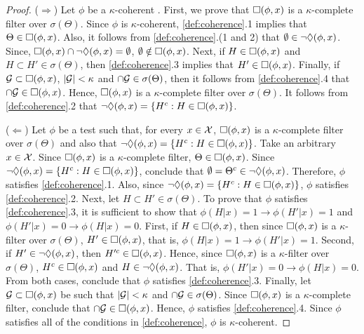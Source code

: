 \begin{proof}
 ($\Longrightarrow$) Let $\phi$ be 
 a $\kappa$-coherent \summ.
 First, we prove that $\square({\phi,x})$ is 
 a $\kappa$-complete filter over $\sigma(\Theta)$.
 Since $\phi$ is $\kappa$-coherent, 
 \cref{def:coherence}.1 implies that
 $\Theta \in \square({\phi,x})$.
 Also, it follows from 
 \cref{def:coherence}.(1 and 2) that
 $\emptyset \in \lnot \Diamond({\phi,x})$.
 Since, $\square({\phi,x}) \cap \lnot \Diamond({\phi,x}) = \emptyset$,
 $\emptyset \notin \square({\phi,x})$.
 Next, if $H \in \square({\phi,x})$ and
 $H \subset H' \in \sigma(\Theta)$, then 
 \cref{def:coherence}.3 implies that
 $H' \in \square({\phi,x})$.
 Finally, if $\mathcal{G} \subset \square({\phi,x})$, 
 $|\mathcal{G}| < \kappa$ and
 $\cap \mathcal{G} \in \sigma(\Theta)$, then
 it follows from \cref{def:coherence}.4 
 that $\cap \mathcal{G} \in \square({\phi,x})$.
 Hence, $\square({\phi,x})$ is 
 a $\kappa$-complete filter over $\sigma(\Theta)$.
 It follows from \cref{def:coherence}.2 that
 $\lnot \Diamond({\phi,x}) = \{H^{c}: H \in \square({\phi,x})\}$.

 ($\Longleftarrow$) Let $\phi$ be a test such that, for every $x \in \mathcal{X}$,
 $\square({\phi,x})$ is a $\kappa$-complete filter over $\sigma(\Theta)$ and 
 also that $\lnot \Diamond({\phi,x}) = \{H^{c}: H \in \square({\phi,x})\}$.
 Take an arbitrary $x \in \mathcal{X}$.
 Since $\square({\phi,x})$ is a $\kappa$-complete filter, 
 $\Theta \in \square({\phi,x})$.
 Since $\lnot \Diamond({\phi,x}) = \{H^{c}: H \in \square({\phi,x})\}$,
 conclude that $\emptyset = \Theta^c \in \lnot \Diamond({\phi,x})$.
 Therefore, $\phi$ satisfies \cref{def:coherence}.1.
 Also, since $\lnot \Diamond({\phi,x}) = \{H^{c}: H \in \square({\phi,x})\}$,
 $\phi$ satisfies \cref{def:coherence}.2.
 Next, let $H \subset H' \in \sigma(\Theta)$.
 To prove that $\phi$ satisfies \cref{def:coherence}.3,
 it is sufficient to show that
 $\phi(H|x) = 1 \rightarrow \phi(H'|x) = 1$ and
 $\phi(H'|x) = 0 \rightarrow \phi(H|x) = 0$.
 First, if $H \in \square({\phi,x})$, then since 
 $\square({\phi,x})$ is a $\kappa$-filter over $\sigma(\Theta)$,
 $H' \in \square({\phi,x})$, that is, 
 $\phi(H|x) = 1 \rightarrow \phi(H'|x) = 1$.
 Second, if $H' \in \lnot \Diamond({\phi,x})$, then
 $H'^c \in \square({\phi,x})$. Hence, since
 $\square({\phi,x})$ is a $\kappa$-filter over $\sigma(\Theta)$,
 $H^c \in \square({\phi,x})$ and $H \in \lnot \Diamond({\phi,x})$.
 That is, $\phi(H'|x) = 0 \rightarrow \phi(H|x) = 0$.
 From both cases, conclude that 
 $\phi$ satisfies \cref{def:coherence}.3.
 Finally, let $\mathcal{G} \subset \square({\phi,x})$ be such that 
 $|\mathcal{G}| < \kappa$ and
 $\cap \mathcal{G} \in \sigma(\Theta)$.
 Since $\square({\phi,x})$ is a $\kappa$-complete filter,
 conclude that $\cap \mathcal{G} \in \square({\phi,x})$.
 Hence, $\phi$ satisfies \cref{def:coherence}.4.
 Since $\phi$ satisfies all of the conditions in
 \cref{def:coherence}, $\phi$ is $\kappa$-coherent.
\end{proof}

